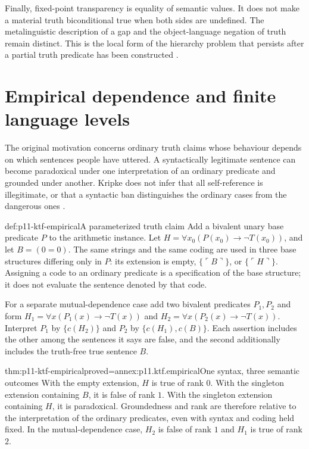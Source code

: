 Finally, fixed-point transparency is equality of semantic values. It does
not make a material truth biconditional true when both sides are undefined.
The metalinguistic description of a gap and the object-language negation of
truth remain distinct. This is the local form of the hierarchy problem
that persists after a partial truth predicate has been constructed
\cite[pp.~713--715]{Kripke1975}.

\section{Empirical dependence and finite language levels}

The original motivation concerns ordinary truth claims whose behaviour
depends on which sentences people have uttered. A syntactically legitimate
sentence can become paradoxical under one interpretation of an ordinary
predicate and grounded under another. Kripke does not infer that all
self-reference is illegitimate, or that a syntactic ban distinguishes
the ordinary cases from the dangerous ones
\cite[pp.~690--699, 706--708]{Kripke1975}.

\begin{hbdefinition}{def:p11-ktf-empirical}{A parameterized truth claim}
Add a bivalent unary base predicate \(P\) to the arithmetic instance. Let
\(H=\forall x_0(P(x_0)\to\neg T(x_0))\), and let
\(B=(0=0)\). The same strings and the same coding are used in three
base structures differing only in \(P\): its extension is empty,
\(\{\ulcorner B\urcorner\}\), or
\(\{\ulcorner H\urcorner\}\). Assigning a code to an ordinary
predicate is a specification of the base structure; it does not evaluate
the sentence denoted by that code.

For a separate mutual-dependence case add two bivalent predicates
\(P_1,P_2\) and form
\(H_1=\forall x(P_1(x)\to\neg T(x))\) and
\(H_2=\forall x(P_2(x)\to\neg T(x))\).
Interpret \(P_1\) by \(\{c(H_2)\}\) and \(P_2\) by
\(\{c(H_1),c(B)\}\). Each assertion includes the other among
the sentences it says are false, and the second additionally includes
the truth-free true sentence \(B\).
\end{hbdefinition}

\begin{hbtheorem}{thm:p11-ktf-empirical}{proved=annex:p11.ktf.empirical}{One syntax, three semantic outcomes}
With the empty extension, \(H\) is true of rank \(0\). With the
singleton extension containing \(B\), it is false of rank \(1\).
With the singleton extension containing \(H\), it is paradoxical.
Groundedness and rank are therefore relative to the interpretation of
the ordinary predicates, even with syntax and coding held fixed.
In the mutual-dependence case, \(H_2\) is false of rank \(1\)
and \(H_1\) is true of rank \(2\).
\end{hbtheorem}

